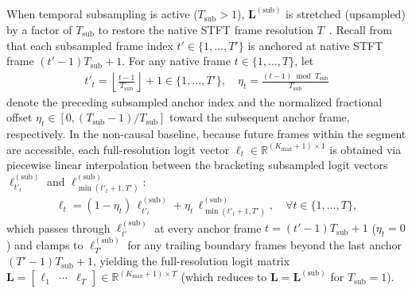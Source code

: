 \documentclass[lettersize,journal]{IEEEtran}
\begin{document}
When temporal subsampling is active ($T_{\mathrm{sub}} > 1$), $\mathbf{L}^{(\mathrm{sub})}$ is stretched (upsampled) by a factor of $T_{\mathrm{sub}}$ to restore the native \gls{STFT} frame resolution $T$~\cite{cornell2022overlapped}. Recall from~ that each subsampled frame index $t' \in \{1, \dots, T'\}$ is anchored at native \gls{STFT} frame $(t'-1)T_{\mathrm{sub}} + 1$. For any native frame $t \in \{1, \dots, T\}$, let
\begin{align}
  t'_t = \left\lfloor \frac{t - 1}{T_{\mathrm{sub}}} \right\rfloor + 1 \in \{1, \dots, T'\}, \quad \eta_t = \frac{(t - 1) \bmod T_{\mathrm{sub}}}{T_{\mathrm{sub}}}
  \label{eq:upsample_index_offset}
\end{align}
denote the preceding subsampled anchor index and the normalized fractional offset $\eta_t \in [0, (T_{\mathrm{sub}}-1)/T_{\mathrm{sub}}]$ toward the subsequent anchor frame, respectively. In the non-causal baseline, because future frames within the segment are accessible, each full-resolution logit vector $\bm{\ell}_t \in \mathbb{R}^{(K_{\mathrm{max}} + 1) \times 1}$ is obtained via piecewise linear interpolation between the bracketing subsampled logit vectors $\bm{\ell}_{t'_t}^{(\mathrm{sub})}$ and $\bm{\ell}_{\min(t'_t + 1, T')}^{(\mathrm{sub})}$:
\begin{align}
  \bm{\ell}_t = (1 - \eta_t)\,\bm{\ell}_{t'_t}^{(\mathrm{sub})} + \eta_t\,\bm{\ell}_{\min(t'_t + 1, T')}^{(\mathrm{sub})}, \quad \forall t \in \{1, \dots, T\},
  \label{eq:linear_upsampling}
\end{align}
which passes through $\bm{\ell}_{t'}^{(\mathrm{sub})}$ at every anchor frame $t = (t'-1)T_{\mathrm{sub}} + 1$ ($\eta_t = 0$) and clamps to $\bm{\ell}_{T'}^{(\mathrm{sub})}$ for any trailing boundary frames beyond the last anchor $(T'-1)T_{\mathrm{sub}} + 1$, yielding the full-resolution logit matrix $\mathbf{L} = \begin{bmatrix} \bm{\ell}_1 & \cdots & \bm{\ell}_T \end{bmatrix} \in \mathbb{R}^{(K_{\mathrm{max}} + 1) \times T}$ (which reduces to $\mathbf{L} = \mathbf{L}^{(\mathrm{sub})}$ for $T_{\mathrm{sub}} = 1$).
\end{document}
